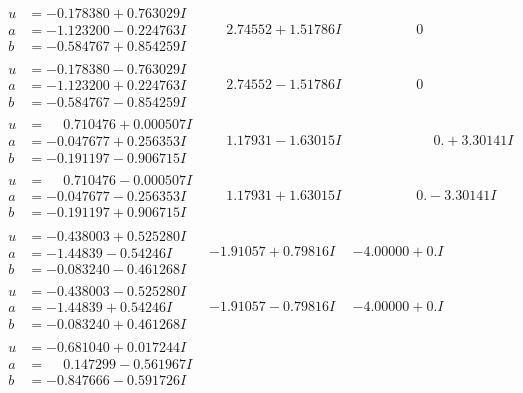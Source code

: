 \documentclass[1p]{elsarticle_modified}
\theoremstyle{definition}
\begin{document}
$$\begin{array}{c|c|c}
\begin{aligned}
u &= -0.178380 + 0.763029 I \\
a &= -1.123200 - 0.224763 I \\
b &= -0.584767 + 0.854259 I\end{aligned}
 & \phantom{-}2.74552 + 1.51786 I & \phantom{-0.000000 } 0 \\ \hline\begin{aligned}
u &= -0.178380 - 0.763029 I \\
a &= -1.123200 + 0.224763 I \\
b &= -0.584767 - 0.854259 I\end{aligned}
 & \phantom{-}2.74552 - 1.51786 I & \phantom{-0.000000 } 0 \\ \hline\begin{aligned}
u &= \phantom{-}0.710476 + 0.000507 I \\
a &= -0.047677 + 0.256353 I \\
b &= -0.191197 - 0.906715 I\end{aligned}
 & \phantom{-}1.17931 - 1.63015 I & \phantom{-0.000000 -}0. + 3.30141 I \\ \hline\begin{aligned}
u &= \phantom{-}0.710476 - 0.000507 I \\
a &= -0.047677 - 0.256353 I \\
b &= -0.191197 + 0.906715 I\end{aligned}
 & \phantom{-}1.17931 + 1.63015 I & \phantom{-0.000000 } 0. - 3.30141 I \\ \hline\begin{aligned}
u &= -0.438003 + 0.525280 I \\
a &= -1.44839 - 0.54246 I \\
b &= -0.083240 - 0.461268 I\end{aligned}
 & -1.91057 + 0.79816 I & -4.00000 + 0. I\phantom{ +0.000000I} \\ \hline\begin{aligned}
u &= -0.438003 - 0.525280 I \\
a &= -1.44839 + 0.54246 I \\
b &= -0.083240 + 0.461268 I\end{aligned}
 & -1.91057 - 0.79816 I & -4.00000 + 0. I\phantom{ +0.000000I} \\ \hline\begin{aligned}
u &= -0.681040 + 0.017244 I \\
a &= \phantom{-}0.147299 - 0.561967 I \\
b &= -0.847666 - 0.591726 I\end{aligned}

\end{array}$$
\end{document}
